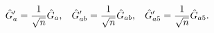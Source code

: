 \begin{equation}
\hat{G}_{a}^{\prime}=\frac{1}{\sqrt{n}}\hat{G}_{a}, 
\hspace{0.3cm}
\hat{G}_{ab}^{\prime}=\frac{1}{\sqrt{n}}\hat{G}_{ab}, 
\hspace{0.3cm}
\hat{G}_{a5}^{\prime}=\frac{1}{\sqrt{n}}\hat{G}_{a5}. 
\end{equation}

